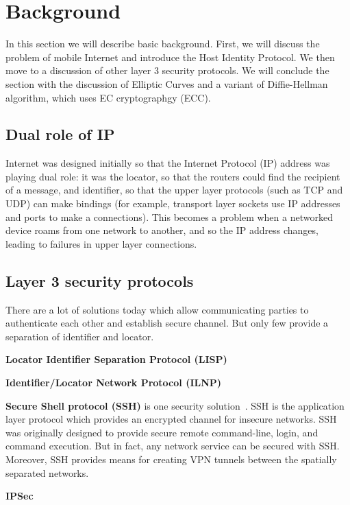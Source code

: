 \section{Background}
\label{section:background}

In this section we will describe basic background. First, we will
discuss the problem of mobile Internet and introduce the Host Identity
Protocol. We then move to a discussion of other layer 3 security protocols.
We will conclude the section with the discussion of Elliptic Curves and
a variant of Diffie-Hellman algorithm, which uses EC cryptographgy (ECC).

\subsection{Dual role of IP}

Internet was designed initially so that the Internet Protocol (IP)
address was playing dual role: it was the locator, so that the 
routers could find the recipient of a message, and identifier, so that 
the upper layer protocols (such as TCP and UDP) can make bindings 
(for example, transport layer sockets use IP addresses and ports 
to make a connections). This becomes a problem when a networked 
device roams from one network to another, and so the IP address changes, 
leading to failures in upper layer connections. 

\subsection{Layer 3 security protocols}

There are a lot of solutions today which allow communicating parties 
to authenticate each other and establish secure channel. But only few provide
a separation of identifier and locator.

{\bf Locator Identifier Separation Protocol (LISP)}

{\bf Identifier/Locator Network Protocol (ILNP)}

{\bf Secure Shell protocol (SSH)} is one security solution~\cite{ssh}. SSH is
the application layer protocol which provides an encrypted channel for insecure
networks. SSH was originally designed to provide secure  
remote command-line, login, and command execution. But in fact, 
any network service can be secured with SSH. Moreover, SSH provides
means for creating VPN tunnels between the spatially separated networks.

{\bf IPSec}

